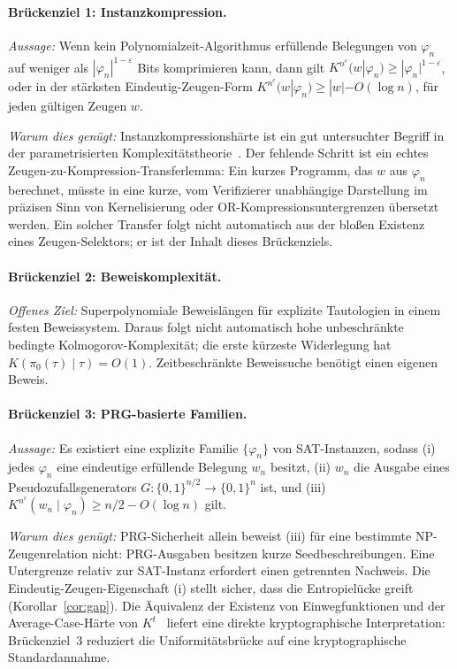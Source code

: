 \documentclass[aps,prd,twocolumn,superscriptaddress,nofootinbib]{revtex4-2}
\theoremstyle{definition}
\theoremstyle{remark}
\begin{document}
\paragraph*{Brückenziel 1: Instanzkompression.}
\emph{Aussage:} Wenn kein Polynomialzeit-Algorithmus erfüllende Belegungen von $\varphi_n$ auf weniger als $|\varphi_n|^{1-\varepsilon}$ Bits komprimieren kann, dann gilt $K^{n^c}(w | \varphi_n) \geq |\varphi_n|^{1-\varepsilon}$, oder in der stärksten Eindeutig-Zeugen-Form $K^{n^c}(w | \varphi_n) \geq |w| - O(\log n)$, für jeden gültigen Zeugen $w$.

\emph{Warum dies genügt:} Instanzkompressionshärte ist ein gut untersuchter Begriff in der parametrisierten Komplexitätstheorie~\cite{FortnowSanthanam2011,DellMelkebeek2014}. Der fehlende Schritt ist ein echtes Zeugen-zu-Kompression-Transferlemma: Ein kurzes Programm, das $w$ aus $\varphi_n$ berechnet, müsste in eine kurze, vom Verifizierer unabhängige Darstellung im präzisen Sinn von Kernelisierung oder OR-Kompressionsuntergrenzen übersetzt werden. Ein solcher Transfer folgt nicht automatisch aus der bloßen Existenz eines Zeugen-Selektors; er ist der Inhalt dieses Brückenziels.

\paragraph*{Brückenziel 2: Beweiskomplexität.}
\emph{Offenes Ziel:} Superpolynomiale Beweislängen
für explizite Tautologien in einem festen Beweissystem.
Daraus folgt nicht automatisch hohe unbeschränkte
bedingte Kolmogorov-Komplexität; die erste kürzeste
Widerlegung hat $K(\pi_0(\tau)\mid\tau)=O(1)$.
Zeitbeschränkte Beweissuche benötigt einen eigenen Beweis.

\paragraph*{Brückenziel 3: PRG-basierte Familien.}
\emph{Aussage:} Es existiert eine explizite Familie $\{\varphi_n\}$ von SAT-Instanzen, sodass (i) jedes $\varphi_n$ eine eindeutige erfüllende Belegung $w_n$ besitzt, (ii) $w_n$ die Ausgabe eines Pseudozufallsgenerators $G: \{0,1\}^{n/2} \to \{0,1\}^n$ ist, und (iii) $K^{n^c}(w_n \mid \varphi_n) \geq n/2 - O(\log n)$ gilt.

\emph{Warum dies genügt:} PRG-Sicherheit allein beweist (iii) für eine bestimmte NP-Zeugenrelation nicht: PRG-Ausgaben besitzen kurze Seedbeschreibungen. Eine Untergrenze relativ zur SAT-Instanz erfordert einen getrennten Nachweis. Die Eindeutig-Zeugen-Eigenschaft (i) stellt sicher, dass die Entropielücke greift (Korollar~\ref{cor:gap}). Die Äquivalenz der Existenz von Einwegfunktionen und der Average-Case-Härte von $K^t$~\cite{LiuPass2020} liefert eine direkte kryptographische Interpretation: Brückenziel~3 reduziert die Uniformitätsbrücke auf eine kryptographische Standardannahme.
\end{document}
